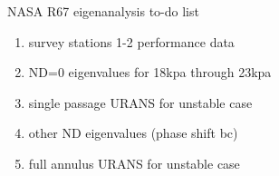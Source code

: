 \documentclass[journal,final]{new-aiaa}
\begin{document}
{ \color{blue} NASA R67 eigenanalysis to-do list

\begin{enumerate}
	\item  {\color{blue}  survey stations 1-2 performance data}
	\item  {\color{blue} ND=0 eigenvalues for 18kpa through 23kpa}
	\item  {\color{blue}  single passage URANS for unstable case}
	\item  {\color{blue}  other ND eigenvalues (phase shift bc)}
	\item  {\color{blue}  full annulus URANS for unstable case}	
	
\end{enumerate}
}

%
%
\end{document}
